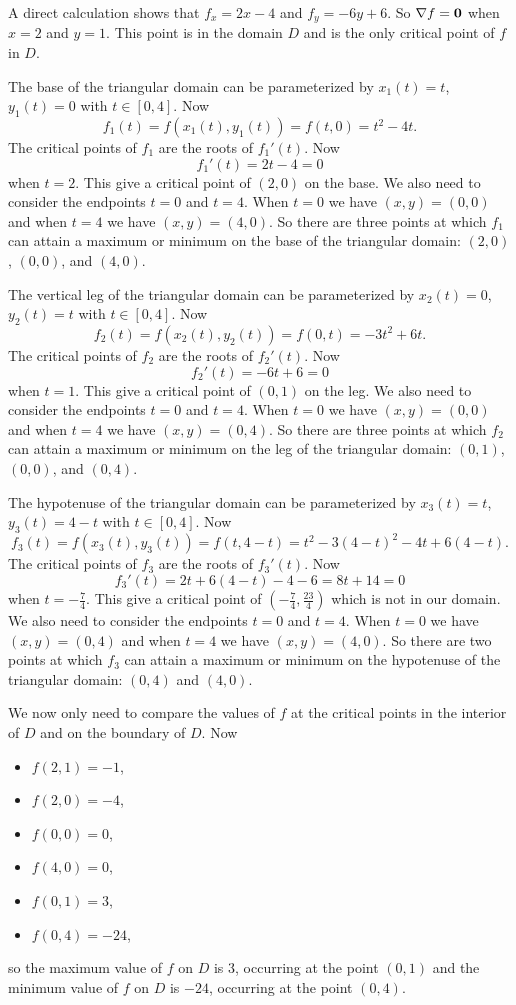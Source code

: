 \begin{activitySolution}
\ba
\item A direct calculation shows that $f_x = 2x-4$ and $f_y = -6y+6$. So $\nabla f = \mathbf{0}$ when $x=2$ and $y = 1$. This point is in the domain $D$ and is the only critical point of $f$ in $D$.

\item The base of the triangular domain can be parameterized by $x_1(t) = t$, $y_1(t) = 0$ with $t \in [0,4]$. Now
\[f_1(t) = f(x_1(t),y_1(t)) = f(t,0) = t^2-4t.\]
The critical points of $f_1$ are the roots of $f_1'(t)$. Now
\[f_1'(t) = 2t-4 = 0\]
when $t=2$. This give a critical point of $(2,0)$ on the base. We also need to consider the endpoints $t=0$ and $t=4$. When $t=0$ we have $(x,y) = (0,0)$ and when $t=4$ we have $(x,y) = (4,0)$. So there are three points at which $f_1$ can attain a maximum or minimum on the base of the triangular domain: $(2,0)$, $(0,0)$, and $(4,0)$.

\item The vertical leg of the triangular domain can be parameterized by $x_2(t) = 0$, $y_2(t) = t$ with $t \in [0,4]$. Now
\[f_2(t) = f(x_2(t),y_2(t)) = f(0,t) = -3t^2+6t.\]
The critical points of $f_2$ are the roots of $f_2'(t)$. Now
\[f_2'(t) = -6t+6 = 0\]
when $t=1$. This give a critical point of $(0,1)$ on the leg. We also need to consider the endpoints $t=0$ and $t=4$. When $t=0$ we have $(x,y) = (0,0)$ and when $t=4$ we have $(x,y) = (0,4)$. So there are three points at which $f_2$ can attain a maximum or minimum on the leg of the triangular domain: $(0,1)$, $(0,0)$, and $(0,4)$.

\item The hypotenuse of the triangular domain can be parameterized by $x_3(t) = t$, $y_3(t) = 4-t$ with $t \in [0,4]$. Now
\[f_3(t) = f(x_3(t),y_3(t)) = f(t,4-t) = t^2-3(4-t)^2-4t+6(4-t).\]
The critical points of $f_3$ are the roots of $f_3'(t)$. Now
\[f_3'(t) = 2t+6(4-t)-4-6 = 8t+14 = 0\]
when $t=-\frac{7}{4}$. This give a critical point of $\left(-\frac{7}{4},\frac{23}{4}\right)$ which is not in our domain. We also need to consider the endpoints $t=0$ and $t=4$. When $t=0$ we have $(x,y) = (0,4)$ and when $t=4$ we have $(x,y) = (4,0)$. So there are two points at which $f_3$ can attain a maximum or minimum on the hypotenuse of the triangular domain: $(0,4)$ and $(4,0)$.

\item We now only need to compare the values of $f$ at the critical points in the interior of $D$ and on the boundary of $D$. Now
\begin{itemize}
\item $f(2,1) = -1$,
\item $f(2,0) = -4$,
\item $f(0,0) = 0$,
\item $f(4,0) = 0$,
\item $f(0,1) = 3$,
\item $f(0,4) = -24$,
\end{itemize}
so the maximum value of $f$ on $D$ is 3, occurring at the point $(0,1)$ and the minimum value of $f$ on $D$ is $-24$, occurring at the point $(0,4)$.

\ea

\end{activitySolution}
\aftera
